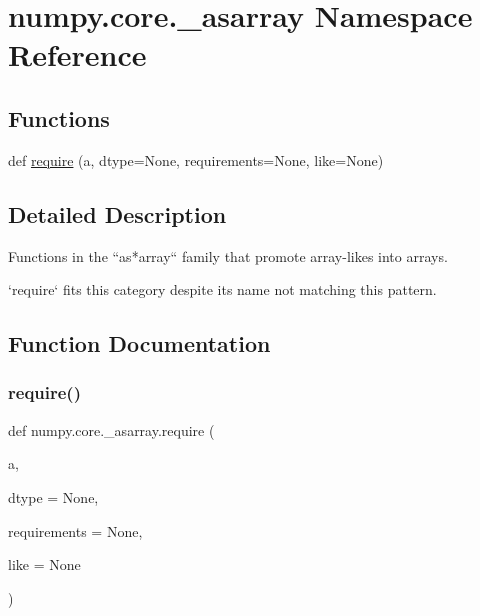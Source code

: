 \hypertarget{namespacenumpy_1_1core_1_1__asarray}{}\section{numpy.\+core.\+\_\+asarray Namespace Reference}
\label{namespacenumpy_1_1core_1_1__asarray}
\subsection*{Functions}
\begin{DoxyCompactItemize}
\item 
def \hyperlink{namespacenumpy_1_1core_1_1__asarray_a378b257ee18ee8927df523a18f5e644a}{require} (a, dtype=None, requirements=None, like=None)
\end{DoxyCompactItemize}


\subsection{Detailed Description}
\begin{DoxyVerb}Functions in the ``as*array`` family that promote array-likes into arrays.

`require` fits this category despite its name not matching this pattern.
\end{DoxyVerb}
 

\subsection{Function Documentation}
\mbox{\label{namespacenumpy_1_1core_1_1__asarray_a378b257ee18ee8927df523a18f5e644a}} 
\subsubsection{\texorpdfstring{require()}{require()}}
{\footnotesize\ttfamily def numpy.\+core.\+\_\+asarray.\+require (\begin{DoxyParamCaption}\item[{}]{a,  }\item[{}]{dtype = {\ttfamily None},  }\item[{}]{requirements = {\ttfamily None},  }\item[{}]{like = {\ttfamily None} }\end{DoxyParamCaption})}

